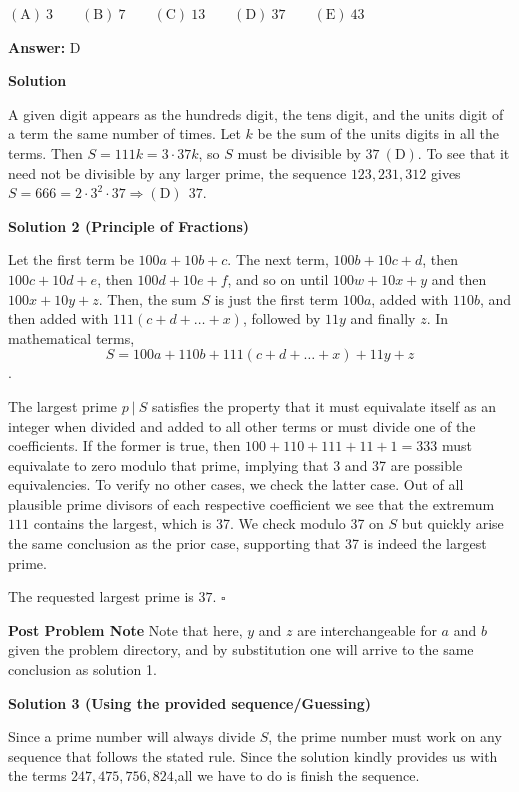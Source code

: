 \begin{enumerate}
 $\mathrm{(A)}\ 3\qquad \mathrm{(B)}\ 7\qquad \mathrm{(C)}\ 13\qquad \mathrm{(D)}\ 37\qquad \mathrm{(E)}\ 43$

 \textbf{Answer: }D



\textbf{Solution}

A given digit appears as the hundreds digit, the tens digit, and the units digit of a term the same number of times. Let $k$ be the sum of the units digits in all the terms. Then $S=111k=3 \cdot 37k$, so $S$ must be divisible by $37\ \mathrm{(D)}$. To see that it need not be divisible by any larger prime, the sequence $123, 231, 312$ gives $S=666=2 \cdot 3^2 \cdot 37\Rightarrow \mathrm{\boxed{(D)~~37}}$.

 



\textbf{Solution 2 (Principle of Fractions)}

Let the first term be $100a+10b+c$. The next term, $100b+10c+d$, then $100c+10d+e$, then $100d+10e+f$, and so on until $100w+10x+y$ and then $100x+10y+z$. Then, the sum $S$ is just the first term $100a$, added with $110b$, and then added with $111(c+d+\dots+x)$, followed by $11y$ and finally $z$. In mathematical terms,
 \[S = 100a+110b+111(c+d+\dots+x) + 11y + z\].

 The largest prime $p~|~S$ satisfies the property that it must equivalate itself as an integer when divided and added to all other terms or must divide one of the coefficients. If the former is true, then $100+110+111+11+1 = 333$ must equivalate to zero modulo that prime, implying that 3 and 37 are possible equivalencies. To verify no other cases, we check the latter case. Out of all plausible prime divisors of each respective coefficient we see that the extremum $111$ contains the largest, which is 37. We check modulo 37 on $S$ but quickly arise the same conclusion as the prior case, supporting that 37 is indeed the largest prime.

 The requested largest prime is $\boxed{37}$. $\square$

 \textbf{Post Problem Note} Note that here, $y$ and $z$ are interchangeable for $a$ and $b$ given the problem directory, and by substitution one will arrive to the same conclusion as solution 1.

 



\textbf{Solution 3 (Using the provided sequence/Guessing)}

Since a prime number will always divide $S$, the prime number must work on any sequence that follows the stated rule. Since the solution kindly provides us with the terms $247,475,756,824$,all we have to do is finish the sequence.


\end{enumerate}
